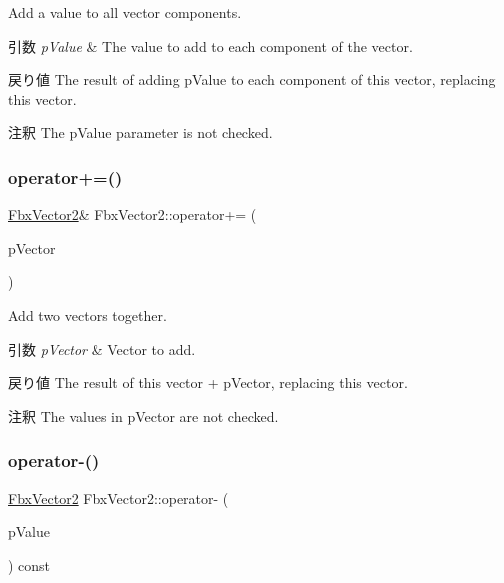 Add a value to all vector components. 
\begin{DoxyParams}{引数}
{\em p\+Value} & The value to add to each component of the vector. \\
\hline
\end{DoxyParams}
\begin{DoxyReturn}{戻り値}
The result of adding p\+Value to each component of this vector, replacing this vector. 
\end{DoxyReturn}
\begin{DoxyRemark}{注釈}
The p\+Value parameter is not checked. 
\end{DoxyRemark}
\mbox{\label{class_fbx_vector2_abd3355ddb4401ca0a774c6b46726fb44}} 
\subsubsection{\texorpdfstring{operator+=()}{operator+=()}\hspace{0.1cm}{\footnotesize\ttfamily [2/2]}}
{\footnotesize\ttfamily \hyperlink{class_fbx_vector2}{Fbx\+Vector2}\& Fbx\+Vector2\+::operator+= (\begin{DoxyParamCaption}\item[{const \hyperlink{class_fbx_vector2}{Fbx\+Vector2} \&}]{p\+Vector }\end{DoxyParamCaption})}

Add two vectors together. 
\begin{DoxyParams}{引数}
{\em p\+Vector} & Vector to add. \\
\hline
\end{DoxyParams}
\begin{DoxyReturn}{戻り値}
The result of this vector + p\+Vector, replacing this vector. 
\end{DoxyReturn}
\begin{DoxyRemark}{注釈}
The values in p\+Vector are not checked. 
\end{DoxyRemark}
\mbox{\label{class_fbx_vector2_a2eca389f246807837ecaea008e6a9ac0}} 
\subsubsection{\texorpdfstring{operator-\/()}{operator-()}\hspace{0.1cm}{\footnotesize\ttfamily [1/3]}}
{\footnotesize\ttfamily \hyperlink{class_fbx_vector2}{Fbx\+Vector2} Fbx\+Vector2\+::operator-\/ (\begin{DoxyParamCaption}\item[{double}]{p\+Value }\end{DoxyParamCaption}) const}

